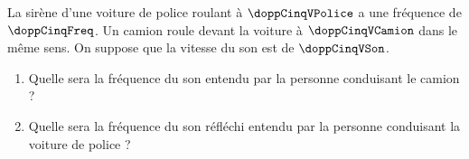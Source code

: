 La sirène d’une voiture de police roulant à $\doppCinqVPolice$ a une fréquence de $\doppCinqFreq$. Un camion roule devant la voiture à $\doppCinqVCamion$ dans le même sens. On suppose que la vitesse du son est de $\doppCinqVSon$.

\begin{enumerate}[label=\alph*)]
    \item Quelle sera la fréquence du son entendu par la personne conduisant le camion ?
    \item Quelle sera la fréquence du son réfléchi entendu par la personne conduisant la voiture de police ?
\end{enumerate}